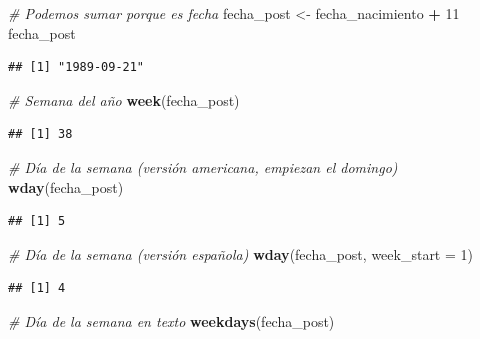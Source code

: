 \documentclass[11pt,]{book}
\newenvironment{Shaded}{\begin{snugshade}}{\end{snugshade}}
\newcommand{\CommentTok}[1]{\textcolor[rgb]{0.37,0.37,0.37}{\textit{#1}}}
\newcommand{\DataTypeTok}[1]{\textcolor[rgb]{0.27,0.27,0.27}{#1}}
\newcommand{\DecValTok}[1]{\textcolor[rgb]{0.06,0.06,0.06}{#1}}
\newcommand{\KeywordTok}[1]{\textcolor[rgb]{0.27,0.27,0.27}{\textbf{#1}}}
\newcommand{\NormalTok}[1]{#1}
\newcommand{\OperatorTok}[1]{\textcolor[rgb]{0.43,0.43,0.43}{\textbf{#1}}}
\newcommand{\StringTok}[1]{\textcolor[rgb]{0.5,0.5,0.5}{#1}}
\begin{document}
\begin{Shaded}
\begin{Highlighting}[]
\CommentTok{# Podemos sumar porque es fecha}
\NormalTok{fecha_post <-}\StringTok{ }\NormalTok{fecha_nacimiento }\OperatorTok{+}\StringTok{ }\DecValTok{11}
\NormalTok{fecha_post}
\end{Highlighting}
\end{Shaded}

\begin{verbatim}
## [1] "1989-09-21"
\end{verbatim}

\begin{Shaded}
\begin{Highlighting}[]
\CommentTok{# Semana del año}
\KeywordTok{week}\NormalTok{(fecha_post)}
\end{Highlighting}
\end{Shaded}

\begin{verbatim}
## [1] 38
\end{verbatim}

\begin{Shaded}
\begin{Highlighting}[]
\CommentTok{# Día de la semana (versión americana, empiezan el domingo)}
\KeywordTok{wday}\NormalTok{(fecha_post)}
\end{Highlighting}
\end{Shaded}

\begin{verbatim}
## [1] 5
\end{verbatim}

\begin{Shaded}
\begin{Highlighting}[]
\CommentTok{# Día de la semana (versión española)}
\KeywordTok{wday}\NormalTok{(fecha_post, }\DataTypeTok{week_start =} \DecValTok{1}\NormalTok{)}
\end{Highlighting}
\end{Shaded}

\begin{verbatim}
## [1] 4
\end{verbatim}

\begin{Shaded}
\begin{Highlighting}[]
\CommentTok{# Día de la semana en texto}
\KeywordTok{weekdays}\NormalTok{(fecha_post)}
\end{Highlighting}
\end{Shaded}
\end{document}

